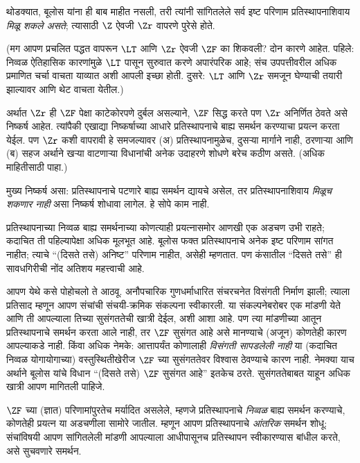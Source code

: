 \documentclass[../../../include/open-logic-section]{subfiles}
\begin{document}
थोडक्यात, बूलोस यांना ही बाब माहीत नसली, तरी त्यांनी सांगितलेले सर्व इष्ट परिणाम प्रतिस्थापनाशिवाय \emph{मिळू शकले असते}; त्यासाठी $\Z$ ऐवजी $\Zr$ वापरणे पुरेसे होते.

(मग आपण प्रचलित पद्धत वापरून $\LT$ आणि $\Zr$ ऐवजी $\ZF$ का शिकवली? दोन कारणे आहेत. पहिले: निव्वळ ऐतिहासिक कारणांमुळे $\LT$ पासून सुरुवात करणे अपारंपरिक आहे; संच उपपत्तीवरील अधिक प्रमाणित चर्चा वाचता याव्यात अशी आपली इच्छा होती. दुसरे: $\LT$ आणि $\Zr$ समजून घेण्याची तयारी झाल्यावर \citealt{Potter2004} आणि \citealt{ButtonLT1} थेट वाचता येतील.)

अर्थात $\Zr$ ही $\ZF$ पेक्षा काटेकोरपणे दुर्बल असल्याने, $\ZF$ सिद्ध करते पण $\Zr$ अनिर्णित ठेवते असे निष्कर्ष आहेत. त्यांपैकी एखाद्या निष्कर्षाच्या आधारे प्रतिस्थापनाचे बाह्य समर्थन करण्याचा प्रयत्न करता येईल. पण $\Zr$ कशी वापरावी हे समजल्यावर (अ) प्रतिस्थापनामुळेच, दुसऱ्या मार्गाने नाही, ठरणाऱ्या आणि (ब) सहज अर्थाने खऱ्या वाटणाऱ्या विधानांची अनेक उदाहरणे शोधणे बरेच कठीण असते. (अधिक माहितीसाठी \citealt[\S13.2]{Potter2004} पाहा.)

मुख्य निष्कर्ष असा: प्रतिस्थापनाचे पटणारे बाह्य समर्थन द्यायचे असेल, तर प्रतिस्थापनाशिवाय \emph{मिळूच शकणार नाही} असा निष्कर्ष शोधावा लागेल. हे सोपे काम नाही.

प्रतिस्थापनाच्या निव्वळ बाह्य समर्थनाच्या कोणत्याही प्रयत्नासमोर आणखी एक अडचण उभी राहते; कदाचित ती पहिल्यापेक्षा अधिक मूलभूत आहे. बूलोस फक्त प्रतिस्थापनाचे अनेक इष्ट परिणाम सांगत नाहीत; त्याचे ``(दिसते तसे) अनिष्ट'' परिणाम नाहीत, असेही म्हणतात. पण कंसातील ``दिसते तसे'' ही सावधगिरीची नोंद अतिशय महत्त्वाची आहे.

आपण येथे कसे पोहोचलो ते आठवू. अनौपचारिक गुणधर्माधारित संचरचनेत विसंगती निर्माण झाली; त्याला प्रतिसाद म्हणून आपण संचांची संचयी-क्रमिक संकल्पना स्वीकारली. या संकल्पनेबरोबर एक मांडणी येते आणि ती आपल्याला तिच्या सुसंगततेची खात्री देईल, अशी आशा आहे. पण त्या मांडणीच्या आतून प्रतिस्थापनाचे समर्थन करता आले नाही, तर $\ZF$ सुसंगत आहे असे मानण्याचे (अजून) कोणतेही कारण आपल्याकडे नाही. किंवा अधिक नेमके: आत्तापर्यंत कोणालाही \emph{विसंगती सापडलेली नाही} या (कदाचित निव्वळ योगायोगाच्या) वस्तुस्थितीखेरीज $\ZF$ च्या सुसंगततेवर विश्वास ठेवण्याचे कारण नाही. नेमक्या याच अर्थाने बूलोस यांचे विधान ``(दिसते तसे) $\ZF$ सुसंगत आहे'' इतकेच ठरते. सुसंगततेबाबत याहून अधिक खात्री आपण मागितली पाहिजे.

$\ZF$ च्या (ज्ञात) परिणामांपुरतेच मर्यादित असलेले, म्हणजे प्रतिस्थापनाचे \emph{निव्वळ} बाह्य समर्थन करण्याचे, कोणतेही प्रयत्न या अडचणीला सामोरे जातील. म्हणून आपण प्रतिस्थापनाचे \emph{आंतरिक} समर्थन शोधू: संचांविषयी आपण सांगितलेली मांडणी आपल्याला आधीपासूनच प्रतिस्थापन स्वीकारण्यास बांधील करते, असे सुचवणारे समर्थन.
\end{document}
